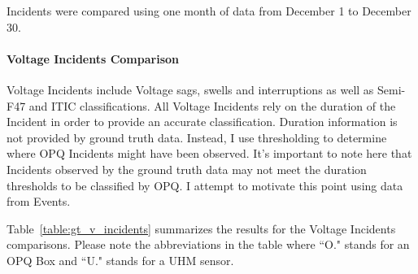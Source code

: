 Incidents were compared using one month of data from December 1 to December 30.

\paragraph{Voltage Incidents Comparison}

Voltage Incidents include Voltage sags, swells and interruptions as well as Semi-F47 and ITIC classifications. All Voltage Incidents rely on the duration of the Incident in order to provide an accurate classification. Duration information is not provided by ground truth data. Instead, I use thresholding to determine where OPQ Incidents might have been observed. It's important to note here that Incidents observed by the ground truth data may not meet the duration thresholds to be classified by OPQ. I attempt to motivate this point using data from Events.

Table~\ref{table:gt_v_incidents} summarizes the results for the Voltage Incidents comparisons. Please note the abbreviations in the table where ``O." stands for an OPQ Box and ``U." stands for a UHM sensor.

